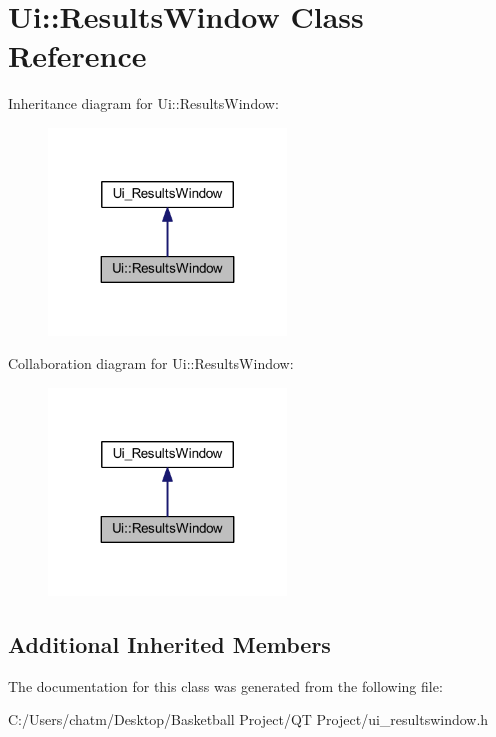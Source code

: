 \hypertarget{class_ui_1_1_results_window}{}\section{Ui\+::Results\+Window Class Reference}
\label{class_ui_1_1_results_window}


Inheritance diagram for Ui\+::Results\+Window\+:\nopagebreak
\begin{figure}[H]
\begin{center}
\leavevmode
\includegraphics[width=179pt]{class_ui_1_1_results_window__inherit__graph}
\end{center}
\end{figure}


Collaboration diagram for Ui\+::Results\+Window\+:\nopagebreak
\begin{figure}[H]
\begin{center}
\leavevmode
\includegraphics[width=179pt]{class_ui_1_1_results_window__coll__graph}
\end{center}
\end{figure}
\subsection*{Additional Inherited Members}


The documentation for this class was generated from the following file\+:\begin{DoxyCompactItemize}
\item 
C\+:/\+Users/chatm/\+Desktop/\+Basketball Project/\+Q\+T Project/ui\+\_\+resultswindow.\+h\end{DoxyCompactItemize}
